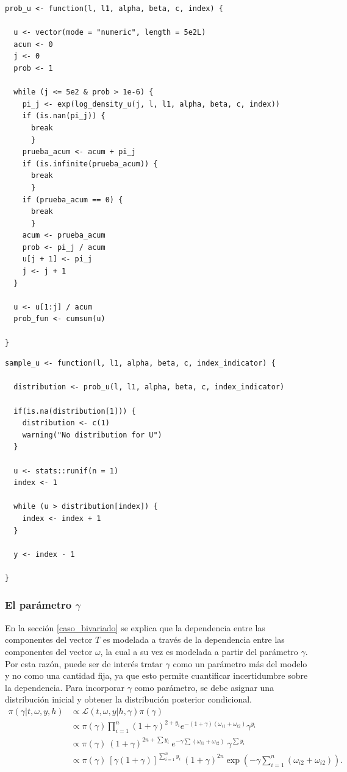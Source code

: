 \documentclass[11pt,a4paper]{article}
\begin{document}
\begin{lstlisting}
prob_u <- function(l, l1, alpha, beta, c, index) {

  u <- vector(mode = "numeric", length = 5e2L)
  acum <- 0
  j <- 0
  prob <- 1

  while (j <= 5e2 & prob > 1e-6) {
    pi_j <- exp(log_density_u(j, l, l1, alpha, beta, c, index))
    if (is.nan(pi_j)) {
      break
      }
    prueba_acum <- acum + pi_j
    if (is.infinite(prueba_acum)) {
      break
      }
    if (prueba_acum == 0) {
      break
      }
    acum <- prueba_acum
    prob <- pi_j / acum
    u[j + 1] <- pi_j
    j <- j + 1
  }

  u <- u[1:j] / acum
  prob_fun <- cumsum(u)

}
\end{lstlisting}

\begin{lstlisting}
sample_u <- function(l, l1, alpha, beta, c, index_indicator) {

  distribution <- prob_u(l, l1, alpha, beta, c, index_indicator)

  if(is.na(distribution[1])) {
    distribution <- c(1)
    warning("No distribution for U")
  }

  u <- stats::runif(n = 1)
  index <- 1

  while (u > distribution[index]) {
    index <- index + 1
  }

  y <- index - 1

}
\end{lstlisting}\leavevmode\newline

\subsubsection*{El parámetro $\gamma$}

En la sección \ref{caso_bivariado} se explica que la dependencia entre las componentes del vector $T$ es modelada a través de la dependencia entre las componentes del vector $\omega$, la cual a su vez es modelada a partir del parámetro $\gamma$. Por esta razón, puede ser de interés tratar $\gamma$ como un parámetro más del modelo y no como una cantidad fija, ya que esto permite cuantificar incertidumbre sobre la dependencia. Para incorporar $\gamma$ como parámetro, se debe asignar una distribución inicial y obtener la distribución posterior condicional.\\

\begin{align*}
\pi(\gamma | t, \omega, y, h) &\propto \mathcal{L}(t, \omega, y | h, \gamma) \pi(\gamma)\\
&\propto \pi(\gamma) \prod_{i = 1}^n (1+ \gamma)^{2+y_i} e^{-(1+\gamma)(\omega_{i1} + \omega_{i2})} \gamma^{y_i}\\
&\propto \pi(\gamma) \ (1+\gamma)^{2n+\sum y_i} \ e^{-\gamma\sum(\omega_{i1} + \omega_{i2})} \ \gamma^{\sum y_i}\\
&\propto \pi(\gamma) \ \left[ \gamma(1+\gamma)\right]^{\sum_{i=1}^n y_i} \ (1+\gamma)^{2n} \exp (-\gamma \sum_{i=1}^n(\omega_{i2} + \omega_{i2})).\\
\end{align*}
\end{document}
